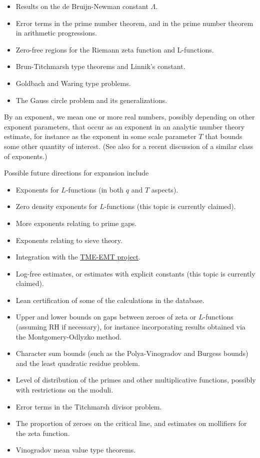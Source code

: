 \begin{itemize}
\item Results on the de Bruijn-Newman constant $\Lambda$.
\item Error terms in the prime number theorem, and in the prime number theorem in arithmetic progressions.
\item Zero-free regions for the Riemann zeta function and L-functions.
\item Brun-Titchmarsh type theorems and Linnik's constant.
\item Goldbach and Waring type problems.
\item The Gauss circle problem and its generalizations.
\end{itemize}

By an exponent, we mean one or more real numbers, possibly depending on other exponent parameters, that occur as an exponent in an analytic number theory estimate, for instance as the exponent in some scale parameter $T$ that bounds some other quantity of interest. (See also \cite{elliott-antaaa} for a recent discussion of a similar class of exponents.)

Possible future directions for expansion include
\begin{itemize}
    \item Exponents for $L$-functions (in both $q$ and $T$ aspects).
    \item Zero density exponents for $L$-functions (this topic is currently claimed).
    \item More exponents relating to prime gaps.
    \item Exponents relating to sieve theory.
    \item Integration with the \href{https://tmeemt.github.io/Chest/}{TME-EMT project}.
    \item Log-free estimates, or estimates with explicit constants (this topic is currently claimed).
    \item Lean certification of some of the calculations in the database.
    \item Upper and lower bounds on gaps between zeroes of zeta or $L$-functions (assuming RH if necessary), for instance incorporating results obtained via the Montgomery-Odlyzko method.
    \item Character sum bounds (such as the Polya-Vinogradov and Burgess bounds) and the least quadratic residue problem.
    \item Level of distribution of the primes and other multiplicative functions, possibly with restrictions on the moduli.
    \item Error terms in the Titchmarsh divisor problem.
    \item The proportion of zeroes on the critical line, and estimates on mollifiers for the zeta function.
    \item Vinogradov mean value type theorems.
\end{itemize}

